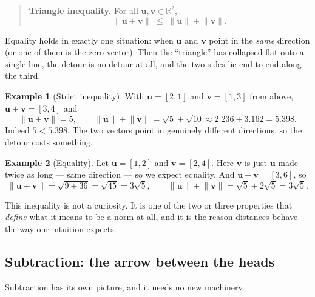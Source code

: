 \documentclass[11pt]{article}
\theoremstyle{definition}
\newtheorem{ex}{Example}
\theoremstyle{remark}
\newcommand{\R}{\mathbb{R}}
\newcommand{\vc}[1]{\mathbf{#1}}
\newcommand{\norm}[1]{\lVert #1\rVert}
\newcommand{\lattice}[4]{%
  \draw[step=1cm,gray!25,very thin] (#1,#3) grid (#2,#4);
  \draw[axisline] (#1,0) -- (#2+0.45,0) node[right,font=\scriptsize,black]{$x$};
  \draw[axisline] (0,#3) -- (0,#4+0.45) node[above,font=\scriptsize,black]{$y$};
}
\begin{document}
\begin{quote}
\textbf{Triangle inequality.} For all $\vc{u},\vc{v}\in\R^{2}$,
\[
  \norm{\vc{u}+\vc{v}} \;\le\; \norm{\vc{u}}+\norm{\vc{v}}.
\]
\end{quote}

\noindent Equality holds in exactly one situation: when $\vc{u}$ and $\vc{v}$
point in the \emph{same} direction (or one of them is the zero vector). Then the
``triangle'' has collapsed flat onto a single line, the detour is no detour at
all, and the two sides lie end to end along the third.

\begin{ex}[Strict inequality]
With $\vc{u}=[2,1]$ and $\vc{v}=[1,3]$ from above, $\vc{u}+\vc{v}=[3,4]$ and
\[
  \norm{\vc{u}+\vc{v}}=5,
  \qquad
  \norm{\vc{u}}+\norm{\vc{v}}=\sqrt5+\sqrt{10}\approx 2.236+3.162=5.398 .
\]
Indeed $5<5.398$. The two vectors point in genuinely different directions, so
the detour costs something.
\end{ex}

\begin{ex}[Equality]
Let $\vc{u}=[1,2]$ and $\vc{v}=[2,4]$. Here $\vc{v}$ is just $\vc{u}$ made
twice as long --- same direction --- so we expect equality. And
$\vc{u}+\vc{v}=[3,6]$, so
\[
  \norm{\vc{u}+\vc{v}}=\sqrt{9+36}=\sqrt{45}=3\sqrt5,
  \qquad
  \norm{\vc{u}}+\norm{\vc{v}}=\sqrt5+2\sqrt5=3\sqrt5 .
\]
\end{ex}

\begin{center}
\end{center}

\noindent This inequality is not a curiosity. It is one of the two or three
properties that \emph{define} what it means to be a norm at all, and it is the
reason distances behave the way our intuition expects.

\subsection{Subtraction: the arrow between the heads}
Subtraction has its own picture, and it needs no new machinery.
\end{document}
